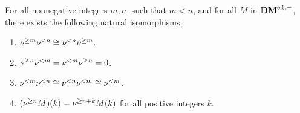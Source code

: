 \begin{prop}\label{prop_sDM_properties}
For all nonnegative integers $m, n$, such that $m < n$, and
for all $M$ in $\DMeff$, there exists the following natural
isomorphisms:

\begin{enumerate}
\item $\sgDM{m}\slDM{n} \cong \slDM{n}\sgDM{m}$.

\item $\sgDM{n}\slDM{m} = \slDM{m}\sgDM{n} = 0$.

\item $\slDM{m}\slDM{n} \cong \slDM{n}\slDM{m} \cong \slDM{m}$.

\item $\tZ[k]{(\sgDM{n}M)} = \sgDM{n + k}\tZ[k]{M}$ for all 
positive integers $k$.

\end{enumerate}
\end{prop}
